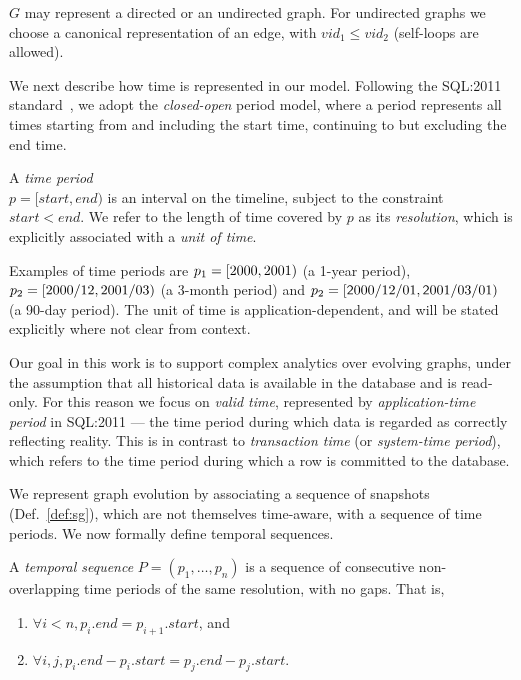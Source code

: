 $G$ may represent a directed or an undirected graph.  For undirected
graphs we choose a canonical representation of an edge, with $vid_1
\leq vid_2$ (self-loops are allowed).

We next describe how time is represented in our model.  Following the
SQL:2011 standard~\cite{DBLP:journals/sigmod/KulkarniM12}, we adopt
the {\em closed-open} period model, where a period represents all
times starting from and including the start time, continuing to but
excluding the end time.

\begin{definition}
A {\em time period} \\$p = [start, end)$ is an interval on the
  timeline, subject to the constraint $start < end$.  We refer to the
  length of time covered by $p$ as its {\em resolution}, which is
  explicitly associated with a {\em unit of time}.
\label{def:period} 
\end{definition}

Examples of time periods are $p_1=[2000,2001)$ (a 1-year
  period), $p_2=[2000/12,2001/03)$ (a 3-month period)
    and $p_2=[\mathsf 2000/12/01,\mathsf 2001/03/01)$ (a 90-day
      period).  The unit of time is application-dependent, and will be
      stated explicitly where not clear from context.

Our goal in this work is to support complex analytics over evolving
graphs, under the assumption that all historical data is available in
the database and is read-only.  For this reason we focus on {\em valid
  time}, represented by {\em application-time period} in SQL:2011 ---
the time period during which data is regarded as correctly reflecting
reality.  This is in contrast to {\em transaction time} (or {\em
  system-time period}), which refers to the time period during which a
row is committed to the database.

We represent graph evolution by associating a sequence of snapshots
(Def.~\ref{def:sg}), which are not themselves time-aware, with a
sequence of time periods.  We now formally define temporal sequences.

\begin{definition} 
A {\em temporal sequence} $P = (p_1, \ldots, p_n)$ is a
sequence of consecutive non-overlapping time periods of the same
resolution, with no gaps.  That is,

\begin{enumerate}
\item $\forall i < n, p_i.end = p_{i+1}.start$, and 
\item $\forall i, j, p_i.end - p_i.start = p_j.end - p_j.start$.
\end{enumerate}
\label{def:tseq} 
\end{definition}

